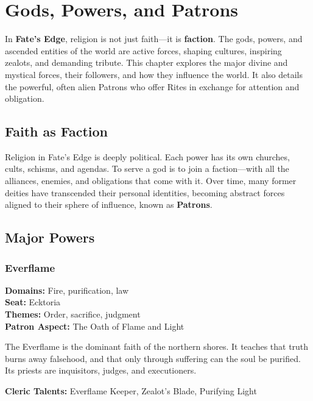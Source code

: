 
\chapter{Gods, Powers, and Patrons}
\label{ch:gods-powers-patrons}

In \textbf{Fate's Edge}, religion is not just faith—it is \textbf{faction}. The gods, powers, and ascended entities of the world are active forces, shaping cultures, inspiring zealots, and demanding tribute. This chapter explores the major divine and mystical forces, their followers, and how they influence the world. It also details the powerful, often alien Patrons who offer Rites in exchange for attention and obligation.

\section{Faith as Faction}

Religion in Fate's Edge is deeply political. Each power has its own churches, cults, schisms, and agendas. To serve a god is to join a faction—with all the alliances, enemies, and obligations that come with it. Over time, many former deities have transcended their personal identities, becoming abstract forces aligned to their sphere of influence, known as \textbf{Patrons}.

\section{Major Powers}

\subsection*{Everflame}

\textbf{Domains:} Fire, purification, law \\
\textbf{Seat:} Ecktoria \\
\textbf{Themes:} Order, sacrifice, judgment \\
\textbf{Patron Aspect:} The Oath of Flame and Light

The Everflame is the dominant faith of the northern shores. It teaches that truth burns away falsehood, and that only through suffering can the soul be purified. Its priests are inquisitors, judges, and executioners.

\textbf{Cleric Talents:} Everflame Keeper, Zealot's Blade, Purifying Light

